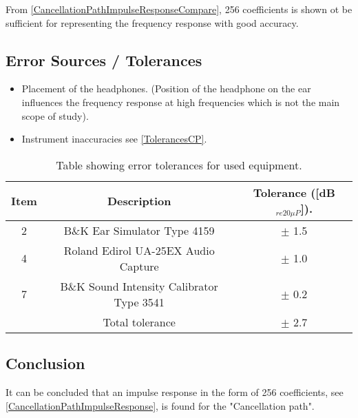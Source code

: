 From \autoref{CancellationPathImpulseResponseCompare}, 256 coefficients is shown ot be sufficient for representing the frequency response with good accuracy. 

\subsection{Error Sources / Tolerances}
\begin{itemize}
	\item Placement of the headphones. (Position of the headphone on the ear  influences the frequency response at high frequencies which is not the main scope of study). 
	\item Instrument inaccuracies see \autoref{TolerancesCP}.
\end{itemize}

\begin{table}[H]
	\centering
	\begin{tabular}{ c c c } \toprule
		{Item}	& 		{Description} 	& {Tolerance ([dB$_{re20\mu P}$])}.	 \\ \bottomrule 
		2	&	B\&K Ear Simulator Type 4159				& $\pm$ 1.5 	\\
		4	&	Roland Edirol UA-25EX Audio Capture			& $\pm$ 1.0	\\
		7	&	B\&K Sound Intensity Calibrator Type 3541	& $\pm$ 0.2	\\ \bottomrule
			&	Total tolerance								& $\pm$ 2.7	\\ \bottomrule	
	\end{tabular}
	\caption{Table showing error tolerances for used equipment.}

	\label{TolerancesCP}
\end{table}

\subsection{Conclusion}
It can be concluded that an impulse response in the form of 256 coefficients, see \autoref{CancellationPathImpulseResponse}, is found for the "Cancellation path". %

